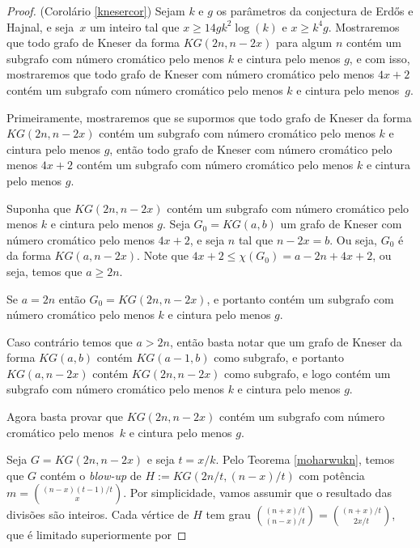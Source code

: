 \begin{proof}{(Corolário \ref{knesercor})}
Sejam $k$ e $g$ os parâmetros da conjectura de Erd\H{o}s e Hajnal, e seja~$x$ um inteiro tal que $x \geq 14gk^2\log(k)$ e $x\geq k^4g$. Mostraremos que todo grafo de Kneser da forma $KG(2n, n-2x)$ para algum $n$ contém um subgrafo com número cromático pelo menos $k$ e cintura pelo menos $g$, e com isso, mostraremos que todo grafo de Kneser com número cromático pelo menos $4x+2$ contém um subgrafo com número cromático pelo menos $k$ e cintura pelo menos~$g$.

Primeiramente, mostraremos que se supormos que todo grafo de Kneser da forma $KG(2n,n-2x)$ contém um subgrafo com número cromático pelo menos $k$ e cintura pelo menos $g$, então todo grafo de Kneser com número cromático pelo menos $4x+2$ contém um subgrafo com número cromático pelo menos $k$ e cintura pelo menos $g$.

Suponha que $KG(2n,n-2x)$ contém um subgrafo com número cromático pelo menos $k$ e cintura pelo menos $g$. Seja $G_0 = KG(a,b)$ um grafo de Kneser com número cromático pelo menos $4x+2$, e seja $n$ tal que $n-2x = b$. Ou seja, $G_0$ é da forma $KG(a,n-2x)$. Note que $4x+2\leq\chi(G_0) = a-2n+4x+2$, ou seja, temos que $a\geq 2n$.

Se $a = 2n$ então $G_0 = KG(2n,n-2x)$, e portanto contém um subgrafo com número cromático pelo menos $k$ e cintura pelo menos $g$.

Caso contrário temos que $a > 2n$, então basta notar que um grafo de Kneser da forma $KG(a,b)$ contém $KG(a-1,b)$ como subgrafo, e portanto $KG(a,n-2x)$ contém $KG(2n, n-2x)$ como subgrafo, e logo contém um subgrafo com número cromático pelo menos $k$ e cintura pelo menos $g$.

Agora basta provar que $KG(2n,n-2x)$ contém um subgrafo com número cromático pelo menos~$k$ e cintura pelo menos $g$.

 


Seja $G = KG(2n,n-2x)$ e seja $t = x/k$. Pelo Teorema \ref{moharwukn}, temos que $G$ contém o \textit{blow-up} de $H := KG(2n/t, (n-x)/t)$ com potência~$m = \binom{(n-x)(t-1)/t}{x}$. Por simplicidade, vamos assumir que o resultado das divisões são inteiros. Cada vértice de $H$ tem grau $\binom{(n+x)/t}{(n-x)/t} = \binom{(n+x)/t}{2x/t}$, que é limitado superiormente por


\end{proof}
